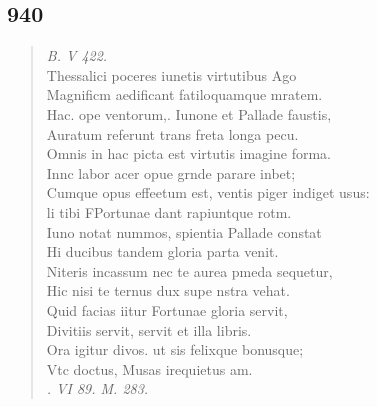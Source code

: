 \documentclass[11pt, a4paper]{report}
\begin{document}
            \subsection*{940}
      \begin{verse}
      \textit{B. V 422.} \\ Thessalici poceres iunetis virtutibus Ago \\ Magnificm aedificant fatiloquamque mratem. \\ Hac. ope ventorum,. Iunone et Pallade faustis, \\ Auratum referunt trans freta longa pecu. \\ Omnis in hac picta est virtutis imagine forma. \\ Innc labor acer opue grnde parare inbet; \\ Cumque opus effeetum est, ventis piger indiget usus: \\ li tibi FPortunae dant rapiuntque rotm. \\ Iuno notat nummos, spientia Pallade constat \\ Hi ducibus tandem gloria parta venit. \\ Niteris incassum nec te aurea pmeda sequetur, \\ Hic nisi te ternus dux supe nstra vehat. \\ Quid facias iitur Fortunae gloria servit, \\ Divitiis servit, servit et illa libris. \\ Ora igitur divos. ut sis felixque bonusque; \\ Vtc doctus, Musas irequietus am. \\ \textit{. VI 89. M. 283.} \\ 
      \end{verse}
  
\end{document}

